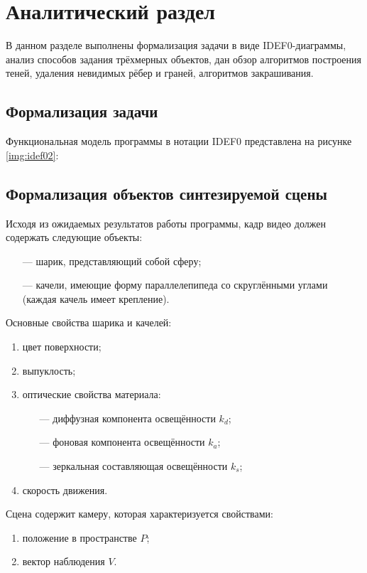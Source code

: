 \chapter{Аналитический раздел}
\fontsize{16}{19}\selectfont

В данном разделе выполнены формализация задачи в виде IDEF0-диаграммы, анализ способов задания трёхмерных объектов, дан обзор алгоритмов построения теней, удаления невидимых рёбер и граней, алгоритмов закрашивания.

\section{Формализация задачи}

Функциональная модель программы в нотации IDEF0 представлена на рисунке \ref{img:idef02}:


\section{Формализация объектов синтезируемой сцены}
\label{sec:formalize}

Исходя из ожидаемых результатов работы программы, кадр видео должен содержать следующие объекты:
\begin{itemize}
	\item[---] шарик, представляющий собой сферу;
	\item[---] качели, имеющие форму параллелепипеда со скруглёнными углами (каждая качель имеет крепление).
\end{itemize}

Основные свойства шарика и качелей:
\begin{enumerate}
	\item цвет поверхности;
	\item выпуклость;
	\item оптические свойства материала:
		\begin{itemize}
			\item[---] диффузная компонента освещённости $k_d$;
			\item[---] фоновая компонента освещённости $k_a$;
			\item[---] зеркальная составляющая освещённости $k_s$;
		\end{itemize}
	\item скорость движения.
\end{enumerate}

Сцена содержит камеру, которая характеризуется свойствами:
\begin{enumerate}
	\item положение в пространстве $P$;
	\item вектор наблюдения $V$.
\end{enumerate}

